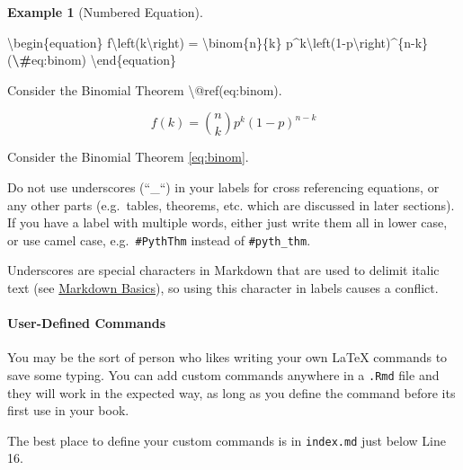 \documentclass[
]{article}
\newenvironment{Shaded}{\begin{snugshade}}{\end{snugshade}}
\newcommand{\NormalTok}[1]{#1}
\newcommand{\SpecialCharTok}[1]{\textcolor[rgb]{0.81,0.36,0.00}{\textbf{#1}}}
\numberwithin{equation}{section}
\numberwithin{figure}{section}
\theoremstyle{break}
\theoremstyle{definition}
\theoremstyle{definition}
\newtheorem{example}{Example}[section]
\theoremstyle{definition}
\theoremstyle{definition}
\theoremstyle{remark}
\begin{document}
\begin{example}[Numbered Equation]
\protect\hypertarget{exm:EqRef}{}\label{exm:EqRef}\leavevmode

\begin{Shaded}
\begin{Highlighting}[]
\NormalTok{\textbackslash{}begin\{equation\} }
\NormalTok{  f\textbackslash{}left(k\textbackslash{}right) = \textbackslash{}binom\{n\}\{k\} p\^{}k\textbackslash{}left(1{-}p\textbackslash{}right)\^{}\{n{-}k\}}
\NormalTok{  (}\SpecialCharTok{\textbackslash{}\#}\NormalTok{eq:binom)}
\NormalTok{\textbackslash{}end\{equation\} }
    
\NormalTok{Consider the Binomial Theorem \textbackslash{}@ref(eq:binom).}
\end{Highlighting}
\end{Shaded}

\begin{equation} 
  f\left(k\right) = \binom{n}{k} p^k\left(1-p\right)^{n-k}
  \label{eq:binom}
\end{equation}

Consider the Binomial Theorem \eqref{eq:binom}.

\end{example}

Do not use underscores (``\_``) in your labels for cross referencing equations, or any other parts (e.g.~tables, theorems, etc. which are discussed in later sections). If you have a label with multiple words, either just write them all in lower case, or use camel case, e.g.~\texttt{\#PythThm} instead of \texttt{\#pyth\_thm}.

Underscores are special characters in Markdown that are used to delimit italic text (see \protect\hyperlink{markdown-basics}{Markdown Basics}), so using this character in labels causes a conflict.

\hypertarget{user-defined-commands}{%
\paragraph*{User-Defined Commands}\label{user-defined-commands}}

You may be the sort of person who likes writing your own LaTeX commands to save some typing. You can add custom commands anywhere in a \texttt{.Rmd} file and they will work in the expected way, as long as you define the command before its first use in your book.

The best place to define your custom commands is in \texttt{index.md} just below Line 16.
\end{document}
